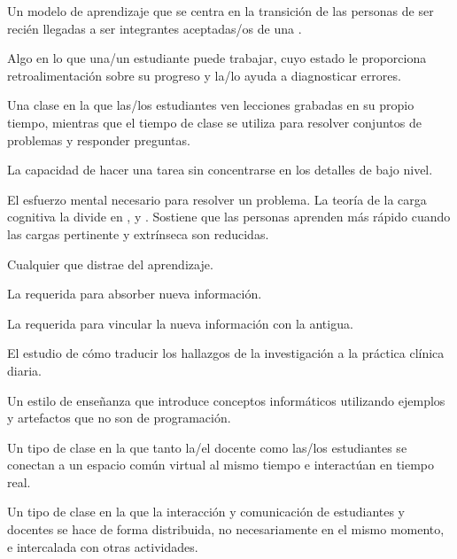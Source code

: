 \begin{description}
 Un modelo de aprendizaje que se centra en la transición de 
las personas de ser recién llegadas a ser integrantes aceptadas/os de una
.

 Algo en lo que una/un estudiante puede trabajar,
cuyo estado le proporciona retroalimentación sobre su  progreso y la/lo ayuda a diagnosticar errores.

 Una clase en la que las/los estudiantes
ven lecciones grabadas en su propio tiempo, mientras que el tiempo de clase
se utiliza para resolver conjuntos de problemas y responder preguntas.

 La capacidad de hacer una tarea sin
concentrarse en los detalles de bajo nivel.

 El esfuerzo mental necesario para resolver un problema.
La teoría de la carga cognitiva la divide en
 ,
y .
Sostiene que las personas aprenden más rápido cuando las cargas pertinente y extrínseca son reducidas.

 Cualquier 
que distrae del aprendizaje.

 La 
requerida para absorber nueva información.

 La 
requerida para vincular la nueva información con la antigua.

 El estudio de cómo traducir
los hallazgos de la investigación a la práctica clínica diaria.

 Un estilo de enseñanza que introduce
conceptos informáticos utilizando ejemplos y artefactos que no son de programación.

 Un tipo de clase en la que tanto la/el docente como las/los estudiantes se conectan 
a un espacio común virtual al mismo tiempo e interactúan en tiempo real. 

 Un tipo de clase en la que la interacción y comunicación de estudiantes y docentes
se hace de forma distribuida, no necesariamente en el mismo momento, e intercalada con otras actividades. 


\end{description}

